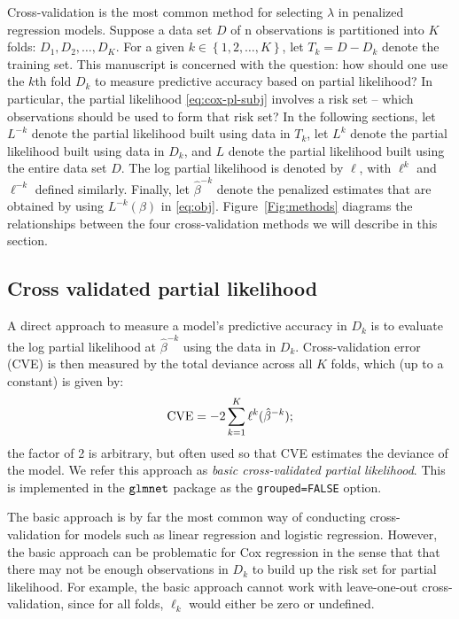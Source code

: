 \par Cross-validation is the most common method for selecting $\lambda$ in penalized regression models. Suppose a data set $D$ of n observations is partitioned into $K$ folds: $D_{1}, D_{2}, \ldots, D_{K}$. For a given $k \in \left\{1,2,\ldots, K\right\}$, let $T_{k} = D - D_{k}$ denote the training set. This manuscript is concerned with the question: how should one use the $k$th fold $D_{k}$ to measure predictive accuracy based on partial likelihood? In particular, the partial likelihood \eqref{eq:cox-pl-subj} involves a risk set -- which observations should be used to form that risk set?  In the following sections, let $L^{-k}$ denote the partial likelihood built using data in $T_k$, let $L^{k}$ denote the partial likelihood built using data in $D_k$, and $L$ denote the partial likelihood built using the entire data set $D$.  The log partial likelihood is denoted by $\ell$, with $\ell^k$ and $\ell^{-k}$ defined similarly. Finally, let $\hat{\beta}^{-k}$ denote the penalized estimates that are obtained by using $L^{-k}(\beta)$ in \eqref{eq:obj}.  Figure~\ref{Fig:methods} diagrams the relationships between the four cross-validation methods we will describe in this section.

\subsection{Cross validated partial likelihood} 
\label{Sec:cox-cv-existing}

\par A direct approach to measure a model's predictive accuracy in $D_k$ is to evaluate the log partial likelihood at $\hat{\beta}^{-k}$ using the data in $D_k$. Cross-validation error (CVE) is then measured by the total deviance across all $K$ folds, which (up to a constant) is given by:
\begin{equation}
  \label{eq:basic}
  \textrm{CVE} = -2 \sum_{k=1}^{K} \ell^{k}(\hat{\beta}^{-k});
\end{equation}
the factor of 2 is arbitrary, but often used so that CVE estimates the deviance of the model.
We refer this approach as \emph{basic cross-validated partial likelihood}. This is implemented in the $\tt{glmnet}$ package as the \texttt{grouped=FALSE} option.

\par The basic approach is by far the most common way of conducting cross-validation for models such as linear regression and logistic regression. However, the basic approach can be problematic for Cox regression in the sense that that there may not be enough observations in $D_k$ to build up the risk set for partial likelihood. For example, the basic approach cannot work with leave-one-out cross-validation, since for all folds, $\ell_k$ would either be zero or undefined.


